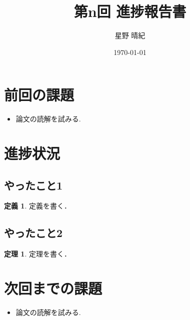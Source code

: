 \documentclass[10pt,a4paper]{jarticle}  %
\theoremstyle{definition}
\newtheorem{definition}{定義}
\newtheorem{theorem}{定理}
\begin{document}
\title{第n回 進捗報告書}
\author{星野 晴紀}
\date{\today}
\maketitle

\section{前回の課題}
\begin{itemize}
    \item 論文\cite{guo2022pid}の読解を試みる.
\end{itemize}

\section{進捗状況}
\subsection{やったこと1}
\begin{definition}
    定義を書く．
\end{definition}


\subsection{やったこと2}
\begin{theorem}
    定理を書く．
\end{theorem}

\section{次回までの課題}
\begin{itemize}
    \item 論文\cite{guo2022pid}の読解を試みる.
\end{itemize}

\end{document}
